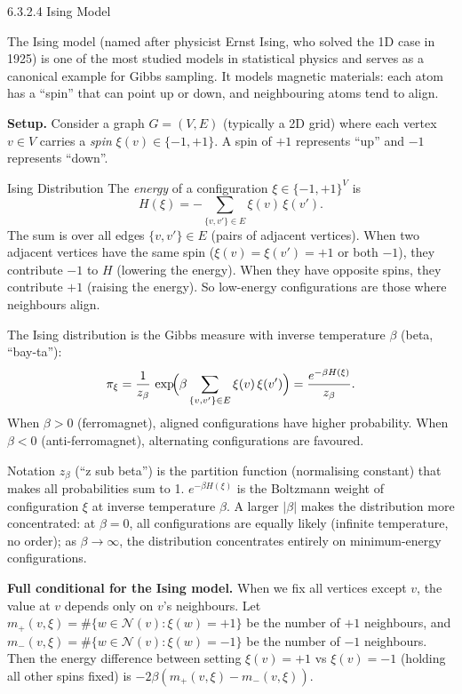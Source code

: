 \documentclass[aspectratio=169,10pt]{beamer}
\begin{document}
\begin{frame}[allowframebreaks]{6.3.2.4 Ising Model}

The Ising model (named after physicist Ernst Ising, who solved the 1D case in 1925) is one of the most studied models in statistical physics and serves as a canonical example for Gibbs sampling.
It models magnetic materials: each atom has a ``spin'' that can point up or down, and neighbouring atoms tend to align.

\textbf{Setup.}
Consider a graph $G = (V,E)$ (typically a 2D grid) where each vertex $v \in V$ carries a \emph{spin} $\xi(v) \in \{-1, +1\}$.
A spin of $+1$ represents ``up'' and $-1$ represents ``down''.

\begin{block}{Ising Distribution}
The \emph{energy} of a configuration $\xi \in \{-1,+1\}^V$ is
\[
  H(\xi) = -\sum_{\{v,v'\} \in E} \xi(v)\,\xi(v').
\]
The sum is over all edges $\{v,v'\} \in E$ (pairs of adjacent vertices).
When two adjacent vertices have the same spin ($\xi(v) = \xi(v') = +1$ or both $-1$), they contribute $-1$ to $H$ (lowering the energy).
When they have opposite spins, they contribute $+1$ (raising the energy).
So low-energy configurations are those where neighbours align.

The Ising distribution is the Gibbs measure with inverse temperature $\beta$ (beta, ``bay-ta''):
\[
  \pi_\xi = \frac{1}{z_\beta}\,\exp\!\Bigl(\beta \sum_{\{v,v'\} \in E} \xi(v)\,\xi(v')\Bigr) = \frac{e^{-\beta H(\xi)}}{z_\beta}.
\]
When $\beta > 0$ (ferromagnet), aligned configurations have higher probability.
When $\beta < 0$ (anti-ferromagnet), alternating configurations are favoured.
\end{block}

\begin{block}{Notation}
$z_\beta$ (``z sub beta'') is the partition function (normalising constant) that makes all probabilities sum to 1.
$e^{-\beta H(\xi)}$ is the Boltzmann weight of configuration $\xi$ at inverse temperature $\beta$.
A larger $|\beta|$ makes the distribution more concentrated: at $\beta = 0$, all configurations are equally likely (infinite temperature, no order); as $\beta \to \infty$, the distribution concentrates entirely on minimum-energy configurations.
\end{block}

\framebreak

\textbf{Full conditional for the Ising model.}
When we fix all vertices except $v$, the value at $v$ depends only on $v$'s neighbours.
Let $m_+(v,\xi) = \#\{w \in \mathcal{N}(v) : \xi(w) = +1\}$ be the number of $+1$ neighbours, and $m_-(v,\xi) = \#\{w \in \mathcal{N}(v) : \xi(w) = -1\}$ be the number of $-1$ neighbours.
Then the energy difference between setting $\xi(v) = +1$ vs $\xi(v) = -1$ (holding all other spins fixed) is $-2\beta(m_+(v,\xi) - m_-(v,\xi))$.


\end{frame}
\end{document}
